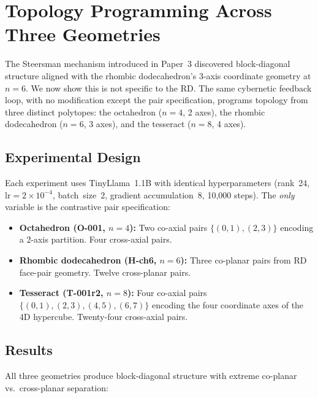 \section{Topology Programming Across Three Geometries}
\label{sec:three-geometries}

The Steersman mechanism introduced in Paper~3 discovered block-diagonal structure
aligned with the rhombic dodecahedron's 3-axis coordinate geometry at $n{=}6$.
We now show this is not specific to the RD\@. The same cybernetic feedback loop,
with no modification except the pair specification, programs topology from three
distinct polytopes: the octahedron ($n{=}4$, 2 axes), the rhombic dodecahedron
($n{=}6$, 3 axes), and the tesseract ($n{=}8$, 4 axes).

\subsection{Experimental Design}

Each experiment uses TinyLlama~1.1B with identical hyperparameters (rank~24,
$\text{lr}{=}2{\times}10^{-4}$, batch~size~2, gradient accumulation~8,
10{,}000 steps). The \emph{only} variable is the contrastive pair specification:

\begin{itemize}
  \item \textbf{Octahedron (O-001, $n{=}4$):} Two co-axial pairs
    $\{(0,1),(2,3)\}$ encoding a 2-axis partition. Four cross-axial pairs.
  \item \textbf{Rhombic dodecahedron (H-ch6, $n{=}6$):} Three co-planar pairs
    from RD face-pair geometry. Twelve cross-planar pairs.
  \item \textbf{Tesseract (T-001r2, $n{=}8$):} Four co-axial pairs
    $\{(0,1),(2,3),(4,5),(6,7)\}$ encoding the four coordinate axes of the
    4D hypercube. Twenty-four cross-axial pairs.
\end{itemize}

\subsection{Results}

All three geometries produce block-diagonal structure with extreme co-planar
vs.\ cross-planar separation:

